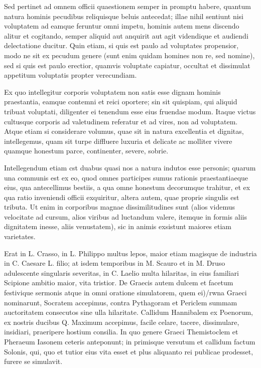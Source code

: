  Sed pertinet ad omnem officii quaestionem semper in promptu habere, quantum natura hominis pecudibus reliquisque beluis antecedat; illae nihil sentiunt nisi voluptatem ad eamque feruntur omni impetu, hominis autem mens discendo alitur et cogitando, semper aliquid aut anquirit aut agit videndique et audiendi delectatione ducitur. Quin etiam, si quis est paulo ad voluptates propensior, modo ne sit ex pecudum genere (sunt enim quidam homines non re, sed nomine), sed si quis est paulo erectior, quamvis voluptate capiatur, occultat et dissimulat appetitum voluptatis propter verecundiam.

 Ex quo intellegitur corporis voluptatem non satis esse dignam hominis praestantia, eamque contemni et reici oportere; sin sit quispiam, qui aliquid tribuat voluptati, diligenter ei tenendum esse eius fruendae modum. Itaque victus cultusque corporis ad valetudinem referatur et ad vires, non ad voluptatem. Atque etiam si considerare volumus, quae sit in natura excellentia et dignitas, intellegemus, quam sit turpe diffluere luxuria et delicate ac molliter vivere quamque honestum parce, continenter, severe, sobrie.

 Intellegendum etiam cst duabus quasi nos a natura indutos esse personis; quarum una communis est ex eo, quod omnes participes sumus rationis praestantiaeque eius, qua antecellimus bestiis, a qua omne honestum decorumque trahitur, et ex qua ratio inveniendi officii exquiritur, altera autem, quae proprie singulis est tributa. Ut enim in corporibus magnae dissimilitudines sunt (alios videmus velocitate ad cursum, alios viribus ad luctandum valere, itemque in formis aliis dignitatem inesse, aliis venustatem), sic in animis exsistunt maiores etiam varietates.

 Erat in L. Crasso, in L. Philippo multus lepos, maior etiam magisque de industria in C. Caesare L. filio; at isdem temporibus in M. Scauro et in M. Druso adulescente singularis severitas, in C. Laelio multa hilaritas, in eius familiari Scipione ambitio maior, vita tristior. De Graecis autem dulcem et facetum festivique sermonis atque in omni oratione simulatorem, quem ei)/rwna Graeci nominarunt, Socratem accepimus, contra Pythagoram et Periclem summam auctoritatem consecutos sine ulla hilaritate. Callidum Hannibalem ex Poenorum, ex nostris ducibus Q. Maximum accepimus, facile celare, tacere, dissimulare, insidiari, praeripere hostium consilia. In quo genere Graeci Themistoclem et Pheraeum Iasonem ceteris anteponunt; in primisque versutum et callidum factum Solonis, qui, quo et tutior eius vita esset et plus aliquanto rei publicae prodesset, furere se simulavit.


